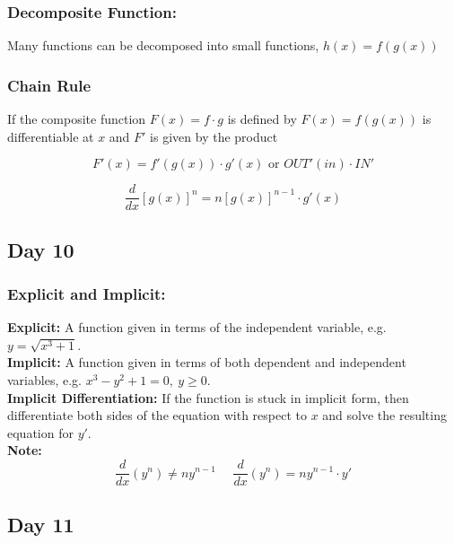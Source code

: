 \documentclass[12pt]{article}
\begin{document}
\subsubsection{Decomposite Function: } Many functions can be decomposed into small functions, $h(x) = f(g(x))$

\subsubsection{Chain Rule} If the composite function $F(x) = f \cdot g$ is defined by $F(x) = f(g(x))$ is differentiable at $x$ and $F'$ is given by the product 

$$F'(x) = f'(g(x)) \cdot g'(x) \text{ or } OUT'(in) \cdot IN'$$

\noindent{}

$$\frac{d}{dx}[g(x)]^n = n[g(x)]^{n-1} \cdot g'(x)$$


\subsection{Day 10}

\subsubsection{Explicit and Implicit:}
\textbf{Explicit: } A function given in terms of the independent variable, e.g. $y=\sqrt{x^3+1}$.\\
\textbf{Implicit: } A function given in terms of both dependent and independent variables, e.g. $x^3-y^2+1=0,\ y \geq 0$.\\
\textbf{Implicit Differentiation: } If the function is stuck in implicit form, then differentiate both sides of the equation with respect to $x$ and solve the resulting equation for $y'$.\\
\textbf{Note: }
$$\frac{d}{dx}(y^n) \neq{} ny^{n-1}  \ \ \ \ \ \ \frac{d}{dx}(y^n) = ny^{n-1} \cdot y'$$

\subsection{Day 11}
\end{document}
